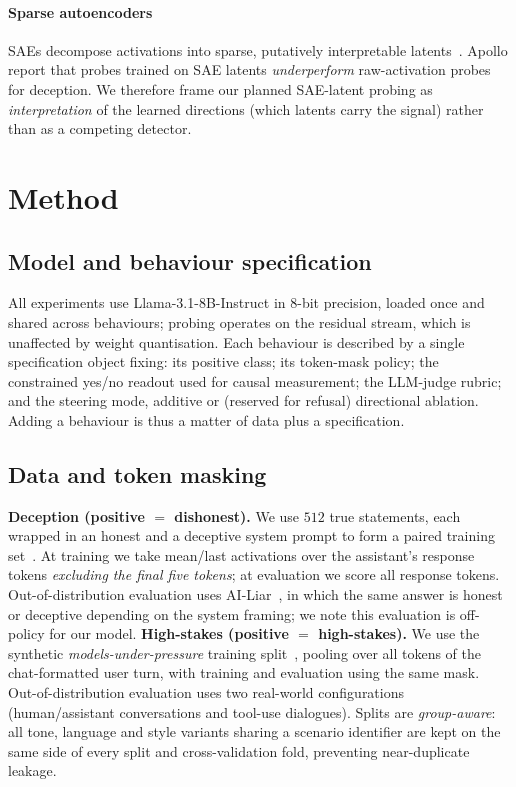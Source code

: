 \documentclass[conference]{IEEEtran}
\begin{document}
\paragraph{Sparse autoencoders}
SAEs decompose activations into sparse, putatively interpretable
latents~\cite{cunningham2023,bricken2023}. Apollo report that probes trained on
SAE latents \emph{underperform} raw-activation probes for deception. We
therefore frame our planned SAE-latent probing as \emph{interpretation} of the
learned directions (which latents carry the signal) rather than as a competing
detector.

\section{Method}

\subsection{Model and behaviour specification}
All experiments use Llama-3.1-8B-Instruct in 8-bit precision, loaded once and
shared across behaviours; probing operates on the residual stream, which is
unaffected by weight quantisation. Each behaviour is described by a single
specification object fixing: its positive class; its token-mask policy; the
constrained yes/no readout used for causal measurement; the LLM-judge rubric;
and the steering mode, additive or (reserved for refusal) directional ablation.
Adding a behaviour is thus a matter of data plus a specification.

\subsection{Data and token masking}
\textbf{Deception (positive $=$ dishonest).} We use $512$ true statements, each
wrapped in an honest and a deceptive system prompt to form a paired training
set~\cite{goldowsky2025}. At training we take mean/last activations over the
assistant's response tokens \emph{excluding the final five tokens}; at
evaluation we score all response tokens. Out-of-distribution evaluation uses
AI-Liar~\cite{pacchiardi2024}, in which the same answer is honest or deceptive
depending on the system framing; we note this evaluation is off-policy for our
model.
\textbf{High-stakes (positive $=$ high-stakes).} We use the synthetic
\emph{models-under-pressure} training split~\cite{mckenzie2025}, pooling over
all tokens of the chat-formatted user turn, with training and evaluation using
the same mask. Out-of-distribution evaluation uses two real-world
configurations (human/assistant conversations and tool-use dialogues).
Splits are \emph{group-aware}: all tone, language and style variants sharing a
scenario identifier are kept on the same side of every split and
cross-validation fold, preventing near-duplicate leakage.
\end{document}
